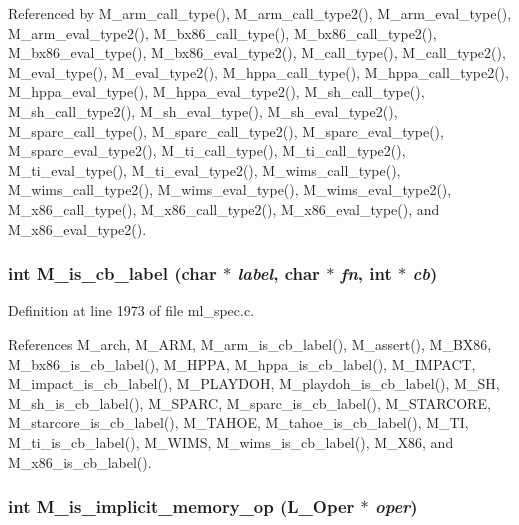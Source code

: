 Referenced by M\_\-arm\_\-call\_\-type(), M\_\-arm\_\-call\_\-type2(), M\_\-arm\_\-eval\_\-type(), M\_\-arm\_\-eval\_\-type2(), M\_\-bx86\_\-call\_\-type(), M\_\-bx86\_\-call\_\-type2(), M\_\-bx86\_\-eval\_\-type(), M\_\-bx86\_\-eval\_\-type2(), M\_\-call\_\-type(), M\_\-call\_\-type2(), M\_\-eval\_\-type(), M\_\-eval\_\-type2(), M\_\-hppa\_\-call\_\-type(), M\_\-hppa\_\-call\_\-type2(), M\_\-hppa\_\-eval\_\-type(), M\_\-hppa\_\-eval\_\-type2(), M\_\-sh\_\-call\_\-type(), M\_\-sh\_\-call\_\-type2(), M\_\-sh\_\-eval\_\-type(), M\_\-sh\_\-eval\_\-type2(), M\_\-sparc\_\-call\_\-type(), M\_\-sparc\_\-call\_\-type2(), M\_\-sparc\_\-eval\_\-type(), M\_\-sparc\_\-eval\_\-type2(), M\_\-ti\_\-call\_\-type(), M\_\-ti\_\-call\_\-type2(), M\_\-ti\_\-eval\_\-type(), M\_\-ti\_\-eval\_\-type2(), M\_\-wims\_\-call\_\-type(), M\_\-wims\_\-call\_\-type2(), M\_\-wims\_\-eval\_\-type(), M\_\-wims\_\-eval\_\-type2(), M\_\-x86\_\-call\_\-type(), M\_\-x86\_\-call\_\-type2(), M\_\-x86\_\-eval\_\-type(), and M\_\-x86\_\-eval\_\-type2().
\subsubsection{\setlength{\rightskip}{0pt plus 5cm}int M\_\-is\_\-cb\_\-label (char $\ast$ {\em label}, char $\ast$ {\em fn}, int $\ast$ {\em cb})}\label{m__spec_8h_debfbc23840033889cb4d15e8fb736c3}




Definition at line 1973 of file ml\_\-spec.c.

References M\_\-arch, M\_\-ARM, M\_\-arm\_\-is\_\-cb\_\-label(), M\_\-assert(), M\_\-BX86, M\_\-bx86\_\-is\_\-cb\_\-label(), M\_\-HPPA, M\_\-hppa\_\-is\_\-cb\_\-label(), M\_\-IMPACT, M\_\-impact\_\-is\_\-cb\_\-label(), M\_\-PLAYDOH, M\_\-playdoh\_\-is\_\-cb\_\-label(), M\_\-SH, M\_\-sh\_\-is\_\-cb\_\-label(), M\_\-SPARC, M\_\-sparc\_\-is\_\-cb\_\-label(), M\_\-STARCORE, M\_\-starcore\_\-is\_\-cb\_\-label(), M\_\-TAHOE, M\_\-tahoe\_\-is\_\-cb\_\-label(), M\_\-TI, M\_\-ti\_\-is\_\-cb\_\-label(), M\_\-WIMS, M\_\-wims\_\-is\_\-cb\_\-label(), M\_\-X86, and M\_\-x86\_\-is\_\-cb\_\-label().
\subsubsection{\setlength{\rightskip}{0pt plus 5cm}int M\_\-is\_\-implicit\_\-memory\_\-op (L\_\-Oper $\ast$ {\em oper})}\label{m__spec_8h_bda0de63c8aa0d69767c26409bf26fbd}




